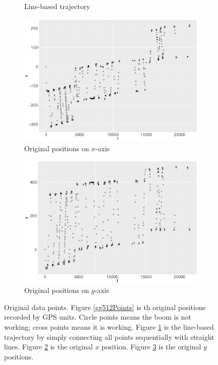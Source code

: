 \begin{figure}
\begin{subfigure}{0.45\textwidth}
    \caption{Line-based trajectory}\label{gg512Path}
    \end{subfigure}
    \begin{subfigure}{0.45\textwidth}
    \centering
    \includegraphics[width=\textwidth]{Chapters/02TractorSplineTheory/plot/ggplot/gg512PointsX.pdf}
    \caption{Original positions on $x$-axis}\label{gg512PointsX}
    \end{subfigure}
    \begin{subfigure}{0.45\textwidth}
    \centering
    \includegraphics[width=\textwidth]{Chapters/02TractorSplineTheory/plot/ggplot/gg512PointsY.pdf}
    \caption{Original positions on $y$-axis}\label{gg512PointsY}
    \end{subfigure}
\caption{Original data points. Figure \ref{gg512Points} is th original positions recorded by GPS units. Circle points means the boom is not working; cross points means it is working. Figure \ref{gg512Path} is the line-based trajectory by simply connecting all points sequentially with straight lines. Figure \ref{gg512PointsX} is the original $x$ position. Figure \ref{gg512PointsY} is the original $y$ positions.}\label{original512}
 \end{figure}


